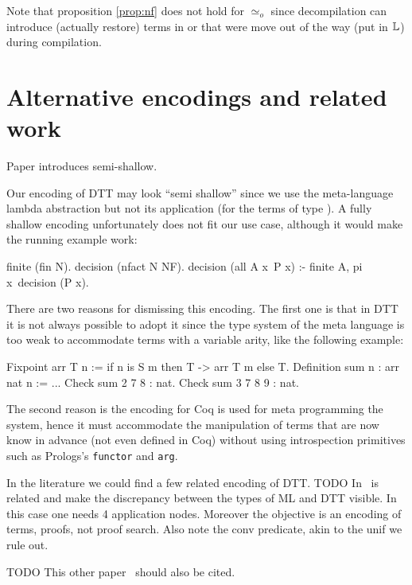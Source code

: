 \documentclass[sigconf,natbib=false,review]{acmart}
\newcommand{\UnifRel}{\ensuremath{\simeq}}
\newcommand{\Uo}{\ensuremath{\UnifRel_o}\xspace}
\begin{document}
Note that proposition \ref{prop:nf} does not hold for \Uo{} since
decompilation can introduce (actually restore) terms in
\maybeeta or \maybebeta that were move out of the way (put in $\mathbb{L}$)
during compilation.

\section{Alternative encodings and related work}

Paper \cite{10.1145/2966268.2966272} introduces semi-shallow.

Our encoding of DTT may look ``semi shallow'' since we use the meta-language
lambda abstraction but not its application (for the terms of type ).
A fully shallow encoding unfortunately does not fit our use case, although
it would make the running example work:

\begin{elpicode}
finite (fin N).
decision (nfact N NF).
decision (all A x\ P x) :- finite A, pi x\ decision (P x).
\end{elpicode}

\noindent
There are two reasons for dismissing this encoding. The first one is that
in DTT it is not always possible to adopt it since the type system
of the meta language is too weak to accommodate terms with a variable arity,
like the following example:

\begin{coqcode}
Fixpoint arr T n := if n is S m then T -> arr T m else T.
Definition sum n : arr nat n := ...
Check sum 2   7 8   : nat.
Check sum 3   7 8 9 : nat.
\end{coqcode}

\noindent
The second reason is the encoding for Coq is used for meta programming the
system, hence it must accommodate the manipulation of terms that are now
know in advance (not even defined in Coq) without using introspection
primitives such as Prologs's \texttt{functor} and \texttt{arg}.

In the literature we could find a few related encoding of DTT.
TODO In~\cite{felty93lics} is related and make the
discrepancy between the types of ML and DTT visible. In this case
one needs 4 application nodes. Moreover the objective is an encoding
of terms, proofs, not proof search. Also note the conv predicate,
akin to the unif we rule out.

TODO This other paper~\cite{10.1007/978-3-031-38499-8_25} should also be cited.
\end{document}

